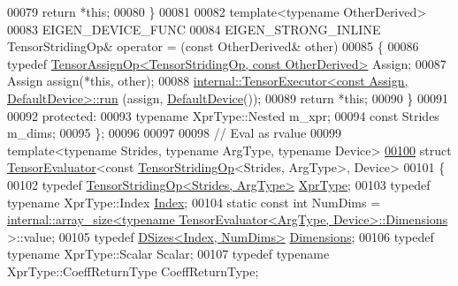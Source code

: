 \begin{DoxyCode}
00079       \textcolor{keywordflow}{return} *\textcolor{keyword}{this};
00080     \}
00081 
00082     \textcolor{keyword}{template}<\textcolor{keyword}{typename} OtherDerived>
00083     EIGEN\_DEVICE\_FUNC
00084     EIGEN\_STRONG\_INLINE TensorStridingOp& operator = (\textcolor{keyword}{const} OtherDerived& other)
00085     \{
00086       \textcolor{keyword}{typedef} \hyperlink{class_eigen_1_1_tensor_assign_op}{TensorAssignOp<TensorStridingOp, const OtherDerived>}
       Assign;
00087       Assign assign(*\textcolor{keyword}{this}, other);
00088       \hyperlink{class_eigen_1_1internal_1_1_tensor_executor}{internal::TensorExecutor<const Assign, DefaultDevice>::run}
      (assign, \hyperlink{struct_eigen_1_1_default_device}{DefaultDevice}());
00089       \textcolor{keywordflow}{return} *\textcolor{keyword}{this};
00090     \}
00091 
00092   \textcolor{keyword}{protected}:
00093     \textcolor{keyword}{typename} XprType::Nested m\_xpr;
00094     \textcolor{keyword}{const} Strides m\_dims;
00095 \};
00096 
00097 
00098 \textcolor{comment}{// Eval as rvalue}
00099 \textcolor{keyword}{template}<\textcolor{keyword}{typename} Str\textcolor{keywordtype}{id}es, \textcolor{keyword}{typename} ArgType, \textcolor{keyword}{typename} Device>
\hyperlink{struct_eigen_1_1_tensor_evaluator_3_01const_01_tensor_striding_op_3_01_strides_00_01_arg_type_01_4_00_01_device_01_4}{00100} \textcolor{keyword}{struct }\hyperlink{struct_eigen_1_1_tensor_evaluator}{TensorEvaluator}<const \hyperlink{class_eigen_1_1_tensor_striding_op}{TensorStridingOp}<Strides, ArgType>, Device>
00101 \{
00102   \textcolor{keyword}{typedef} \hyperlink{class_eigen_1_1_tensor_striding_op}{TensorStridingOp<Strides, ArgType>} 
      \hyperlink{class_eigen_1_1_tensor_striding_op}{XprType};
00103   \textcolor{keyword}{typedef} \textcolor{keyword}{typename} XprType::Index \hyperlink{namespace_eigen_a62e77e0933482dafde8fe197d9a2cfde}{Index};
00104   \textcolor{keyword}{static} \textcolor{keyword}{const} \textcolor{keywordtype}{int} NumDims = 
      \hyperlink{struct_eigen_1_1internal_1_1array__size}{internal::array\_size<typename TensorEvaluator<ArgType, Device>::Dimensions}
      >::value;
00105   \textcolor{keyword}{typedef} \hyperlink{struct_eigen_1_1_d_sizes}{DSizes<Index, NumDims>} \hyperlink{struct_eigen_1_1_d_sizes}{Dimensions};
00106   \textcolor{keyword}{typedef} \textcolor{keyword}{typename} XprType::Scalar Scalar;
00107   \textcolor{keyword}{typedef} \textcolor{keyword}{typename} XprType::CoeffReturnType CoeffReturnType;

\end{DoxyCode}
